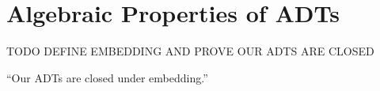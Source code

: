 \section{Algebraic Properties of ADTs}
\label{sec:algebra}

TODO DEFINE EMBEDDING AND PROVE OUR ADTS ARE CLOSED

\begin{theorem}
  “Our ADTs are closed under embedding.”
\end{theorem}
